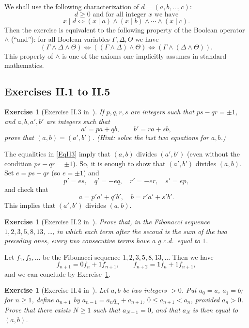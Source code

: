 \documentclass[12pt,letterpaper]{article}
\newtheorem{exer}[thm]{Exercise}
\theoremstyle{definition}
\begin{document}
We shall use the following characterization of $d=(a,b,\ldots,c)$: 
$$
\text{$d\ge0$ and for all integer $x$ we have}
$$ 
$$
x\mid d\iff(x\mid a)\land(x\mid b)\land\cdots\land(x\mid c).
$$ 
Then the exercise is equivalent to the following property of the Boolean operator $\land$ (``and''): for all Boolean variables $\Gamma, \Delta, \Theta$ we have 
$$
(\Gamma \land \Delta \land \Theta) \iff ((\Gamma \land \Delta) \land \Theta) \iff (\Gamma \land (\Delta \land \Theta)).
$$ 
This property of $\land$ is one of the axioms one implicitly assumes in standard mathematics. 

\subsection{Exercises II.1 to II.5} %

\begin{exer}[Exercise II.3 in~\cite{weil1979}]\label{ExII3}
If $p,q,r,s$ are integers such that $ps-qr=\pm 1$, and $a,b,a',b'$ are integers such that
\begin{equation}\label{EqII3}
a'=pa+qb, \qquad b'=ra+sb,
\end{equation} 
prove that $(a,b)=(a',b')$. (Hint: solve the last two equations for $a,b$.) 
\end{exer}

The equalities in \eqref{EqII3} imply that $(a,b)$ divides $(a',b')$ (even without the condition $ps-qr=\pm 1$). So, it is enough to show that $(a',b')$ divides $(a,b)$. Set $e=ps-qr$ (so $e=\pm1$) and 
$$
p'=es,\quad q'=-eq,\quad r'=-er,\quad s'=ep,
$$ 
and check that 
$$
a=p'a'+q'b',\quad b=r'a'+s'b'.
$$ 
This implies that $(a',b')$ divides $(a,b)$. 

\begin{exer}[Exercise II.2 in~\cite{weil1979}]
Prove that, in the Fibonacci sequence $1,2,3,5,8,13$, \ldots, in which each term after the second is the sum of the two preceding ones, every two consecutive terms have a g.c.d.\ equal to $1$.
\end{exer} 

Let $f_1,f_2,\ldots$ be the Fibonacci sequence $1,2,3,5,8,13,\ldots$ Then we have 
\[
f_{n+1}=0f_n+1f_{n+1}, \qquad f_{n+2}=1f_n+1f_{n+1},
\] 
and we can conclude by Exercise~\ref{ExII3}. 

\begin{exer}[Exercise II.4 in~\cite{weil1979}]\label{ExII4}
Let $a,b$ be two integers $>0$. Put $a_0=a$, $a_1=b$; for $n\ge 1$, define $a_{n+1}$ by $a_{n-1}=a_nq_n+a_{n+1}$, $0\le a_{n+1}<a_n$, provided $a_n>0$. Prove that there exists $N\ge 1$ such that $a_{N+1}=0$, and that $a_N$ is then equal to $(a,b)$.
\end{exer} 
\end{document}

